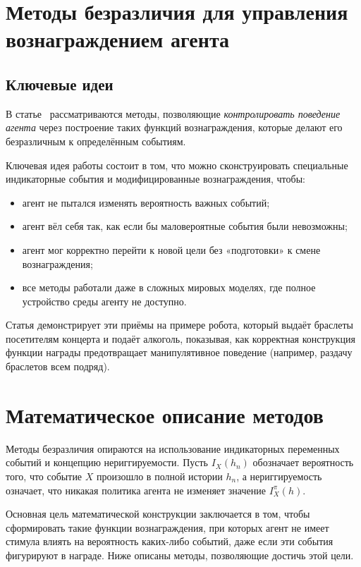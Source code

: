\section{Методы безразличия для управления вознаграждением агента}

\subsection{Ключевые идеи}

В статье~\cite{armstrong2018indiff} рассматриваются методы, позволяющие 
\emph{контролировать поведение агента} через построение таких функций 
вознаграждения, которые делают его безразличным к определённым событиям.

Ключевая идея работы состоит в том, что можно сконструировать специальные 
индикаторные события и модифицированные вознаграждения, чтобы:

\begin{itemize}
    \item агент не пытался изменять вероятность важных событий;
    \item агент вёл себя так, как если бы маловероятные события были невозможны;
    \item агент мог корректно перейти к новой цели без «подготовки» к смене вознаграждения;
    \item все методы работали даже в сложных мировых моделях, где полное 
    устройство среды агенту не доступно.
\end{itemize}

Статья демонстрирует эти приёмы на примере робота, который выдаёт браслеты 
посетителям концерта и подаёт алкоголь, показывая, как корректная конструкция 
функции награды предотвращает манипулятивное поведение (например, раздачу 
браслетов всем подряд).

\section{Математическое описание методов}

Методы безразличия опираются на использование индикаторных переменных событий и 
концепцию нериггируемости. Пусть $I_X(h_n)$ обозначает вероятность того, 
что событие $X$ произошло в полной истории $h_n$, а нериггируемость означает, 
что никакая политика агента не изменяет значение $I_X^\pi(h)$.

Основная цель математической конструкции заключается в том, чтобы сформировать 
такие функции вознаграждения, при которых агент не имеет стимула влиять на 
вероятность каких-либо событий, даже если эти события фигурируют в награде.
Ниже описаны методы, позволяющие достичь этой цели.

